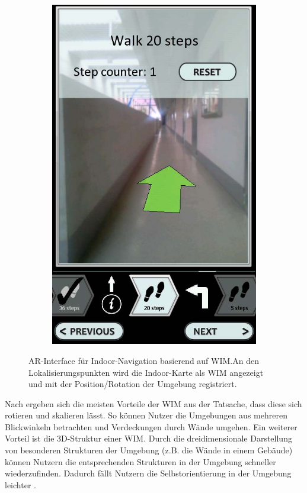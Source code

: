 \begin{figure}
\begin{subfigure}{.18\textwidth}
        \includegraphics[width=\textwidth]{figures/mulloni2011_wim_e.png}
        \caption{}
        \label{sfig:mulloni2011_wim_e}
    \end{subfigure}
    \caption{AR-Interface für Indoor-Navigation basierend auf WIM.\@ An den Lokalisierungspunkten wird die Indoor-Karte als WIM angezeigt und mit der Position/Rotation der Umgebung registriert. }
    \label{fig:mulloni2011_wim}
\end{figure}

Nach \textcite[272]{Stoakley1995} ergeben sich die meisten Vorteile der WIM aus der Tatsache, dass diese sich rotieren und skalieren lässt.
So können Nutzer die Umgebungen aus mehreren Blickwinkeln betrachten und Verdeckungen durch Wände umgehen.
Ein weiterer Vorteil ist die 3D-Struktur einer WIM.
Durch die dreidimensionale Darstellung von besonderen Strukturen der Umgebung (z.B. die Wände in einem Gebäude) können Nutzern die entsprechenden Strukturen in der Umgebung schneller wiederzufinden.
Dadurch fällt Nutzern die Selbstorientierung in der Umgebung leichter \parencite[215]{Mulloni2012}.

